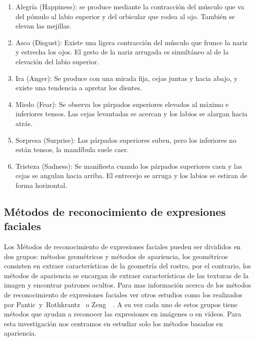 \begin{enumerate}
	\item Alegría (Happiness): se produce mediante la contracción del músculo que va del pómulo al labio superior y del orbicular que rodea al ojo. También se elevan las mejillas. 
	\item Asco (Disgust): Existe una ligera contracción del músculo que frunce la nariz y estrecha los ojos. El gesto de la nariz arrugada es simultáneo al de la elevación del labio superior. 
	\item Ira (Anger): Se produce con una mirada fija, cejas juntas y hacia abajo, y existe una tendencia a apretar los dientes. 
	\item Miedo (Fear): Se observa los párpados superiores elevados al máximo e inferiores tensos. Las cejas levantadas se acercan y los labios se alargan hacia atrás. 
	\item Sorpresa (Surprise): Los párpados superiores suben, pero los inferiores no están tensos, la mandíbula suele caer. 
	\item Tristeza (Sadness): Se manifiesta cuando los párpados superiores caen y las cejas se angulan hacia arriba. El entrecejo se arruga y los labios se estiran de forma horizontal.
\end{enumerate}


\subsection{Métodos de reconocimiento de expresiones faciales}
Los Métodos de reconocimiento de expresiones faciales pueden ser divididos en dos grupos: métodos geométricos y métodos de apariencia, los geométricos consisten en extraer características de la geometría del rostro, por el contrario, los métodos de apariencia se encargan de extraer características de las texturas de la imagen y encontrar patrones ocultos. Para mas información acerca de los métodos de reconocimiento de expresiones faciales  ver otros estudios como los realizados por Pantic~y~Rothkrantz~\cite{Pantic2000} o Zeng~\etal~\cite{Zeng2009}. A su vez cada uno de estos grupos tiene métodos que ayudan a reconocer las expresiones en imágenes o en vídeos. Para esta investigación nos centramos en estudiar solo los métodos basados en apariencia.

